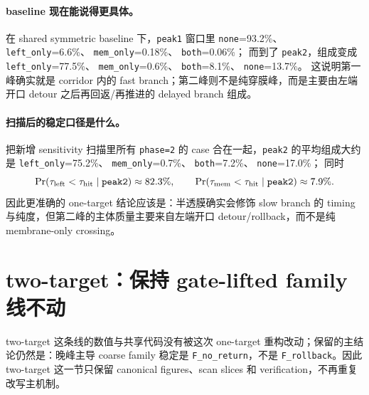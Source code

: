 \documentclass[11pt,fontset=fandol]{ctexart}
\begin{document}
\begin{table}[!htbp]
  \centering
  \caption{left-open vs membrane summary。表中汇报 selected sensitivity cases 的 peak2 组成，以及 late window 中 ``先经左端开口离开 corridor'' 和 ``先发生膜 crossing'' 的条件概率。}
  
\end{table}

\paragraph{baseline 现在能说得更具体。}
在 shared symmetric baseline 下，\texttt{peak1} 窗口里
\texttt{none}=93.2\%、
\texttt{left\_only}=6.6\%、
\texttt{mem\_only}=0.18\%、
\texttt{both}=0.06\%；
而到了 \texttt{peak2}，组成变成
\texttt{left\_only}=77.5\%、
\texttt{mem\_only}=0.6\%、
\texttt{both}=8.1\%、
\texttt{none}=13.7\%。
这说明第一峰确实就是 corridor 内的 fast branch；第二峰则不是纯穿膜峰，而是主要由左端开口 detour 之后再回返/再推进的 delayed branch 组成。

\paragraph{扫描后的稳定口径是什么。}
把新增 sensitivity 扫描里所有 \texttt{phase=2} 的 case 合在一起，\texttt{peak2} 的平均组成大约是
\texttt{left\_only}=75.2\%、
\texttt{mem\_only}=0.7\%、
\texttt{both}=7.2\%、
\texttt{none}=17.0\%；
同时
\[
\Pr(\tau_{\rm left}<\tau_{\rm hit}\mid \texttt{peak2})\approx 82.3\%,\qquad
\Pr(\tau_{\rm mem}<\tau_{\rm hit}\mid \texttt{peak2})\approx 7.9\%.
\]
因此更准确的 one-target 结论应该是：半透膜确实会修饰 slow branch 的 timing 与纯度，但第二峰的主体质量主要来自左端开口 detour/rollback，而不是纯 membrane-only crossing。

\section{two-target：保持 gate-lifted family 线不动}
two-target 这条线的数值与共享代码没有被这次 one-target 重构改动；保留的主结论仍然是：晚峰主导 coarse family 稳定是 \texttt{F\_no\_return}，不是 \texttt{F\_rollback}。因此 two-target 这一节只保留 canonical figures、scan slices 和 verification，不再重复改写主机制。

\begin{table}[!htbp]
  \centering
  \caption{two-target representative cases。}
  
\end{table}
\end{document}
